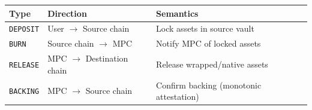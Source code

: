 \begin{center}
\begin{tabular}{lll}
\toprule
\textbf{Type} & \textbf{Direction} & \textbf{Semantics} \\
\midrule
\texttt{DEPOSIT} & User $\to$ Source chain & Lock assets in source vault \\
\texttt{BURN} & Source chain $\to$ MPC & Notify MPC of locked assets \\
\texttt{RELEASE} & MPC $\to$ Destination chain & Release wrapped/native assets \\
\texttt{BACKING} & MPC $\to$ Source chain & Confirm backing (monotonic attestation) \\
\bottomrule
\end{tabular}
\end{center}

